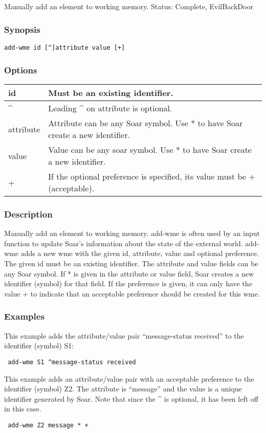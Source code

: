 \subsection{}
\label{add-wme}
Manually add an element to working memory. 
 Status: Complete, EvilBackDoor
\subsubsection*{Synopsis}
  \begin{verbatim}
add-wme id [^]attribute value [+]
\end{verbatim}
\subsubsection*{Options}
\begin{tabular}{|l|l|}
\hline 
 id  & Must be an existing identifier.  \\
 \hline 
 \^{}  & Leading \^{} on attribute is optional.  \\
 \hline 
 attribute  & Attribute can be any Soar symbol. Use * to have Soar create a new identifier.  \\
 \hline 
 value  & Value can be any soar symbol. Use * to have Soar create a new identifier.  \\
 \hline 
 +  & If the optional preference is specified, its value must be + (acceptable).  \\
 \hline 
\end{tabular}
\subsubsection*{Description}
 Manually add an element to working memory. add-wme is often used by an input function to update Soar's information about the state of the external world. 
 add-wme adds a new wme with the given id, attribute, value and optional preference. The given id must be an existing identifier. The attribute and value fields can be any Soar symbol. If * is given in the attribute or value field, Soar creates a new identifier (symbol) for that field. If the preference is given, it can only have the value + to indicate that an acceptable preference should be created for this wme. 
\subsubsection*{Examples}
 This example adds the attribute/value pair ``message-status received'' to the identifier (symbol) S1: \begin{verbatim}
 add-wme S1 ^message-status received
\end{verbatim}
 This example adds an attribute/value pair with an acceptable preference to the identifier (symbol) Z2. The attribute is ``message'' and the value is a unique identifier generated by Soar. Note that since the \^{} is optional, it has been left off in this case. \begin{verbatim}
 add-wme Z2 message * + 
\end{verbatim}
